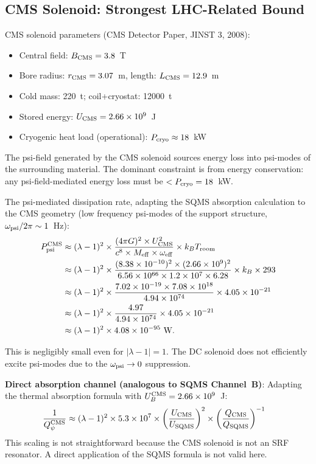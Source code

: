 \documentclass[11pt,twocolumn]{article}
\newcommand{\lam}{\lambda}
\begin{document}
\subsection{CMS Solenoid: Strongest LHC-Related Bound}

CMS solenoid parameters (CMS Detector Paper, JINST 3, 2008):
\begin{itemize}[nosep]
\item Central field: $B_{\rm CMS} = 3.8$~T
\item Bore radius: $r_{\rm CMS} = 3.07$~m, length: $L_{\rm CMS} = 12.9$~m
\item Cold mass: 220~t; coil+cryostat: 12000~t
\item Stored energy: $U_{\rm CMS} = 2.66\times10^9$~J
\item Cryogenic heat load (operational): $P_{\rm cryo} \approx 18$~kW
\end{itemize}

The psi-field generated by the CMS solenoid sources energy loss into psi-modes
of the surrounding material. The dominant constraint is from energy conservation:
any psi-field-mediated energy loss must be $< P_{\rm cryo} = 18$~kW.

The psi-mediated dissipation rate, adapting the SQMS absorption calculation
to the CMS geometry (low frequency psi-modes of the support structure,
$\omega_{\rm psi}/2\pi \sim 1$~Hz):
\begin{align}
P_{\rm psi}^{\rm CMS} &\approx (\lam-1)^2\times
\frac{(4\pi G)^2\times U_{\rm CMS}^2}
{c^8\times M_{\rm eff}\times\omega_{\rm eff}}
\times k_B T_{\rm room}
\nonumber\\
&\approx (\lam-1)^2\times
\frac{(8.38\times10^{-10})^2\times(2.66\times10^9)^2}
{6.56\times10^{66}\times1.2\times10^7\times6.28}
\times k_B\times293
\nonumber\\
&\approx (\lam-1)^2\times
\frac{7.02\times10^{-19}\times7.08\times10^{18}}
{4.94\times10^{74}}
\times4.05\times10^{-21}
\nonumber\\
&\approx (\lam-1)^2\times\frac{4.97}{4.94\times10^{74}}
\times4.05\times10^{-21}
\nonumber\\
&\approx (\lam-1)^2\times4.08\times10^{-95}~\text{W}.
\end{align}

This is negligibly small even for $|\lam-1| = 1$. The DC solenoid does not
efficiently excite psi-modes due to the $\omega_{\rm psi} \to 0$ suppression.

\textbf{Direct absorption channel (analogous to SQMS Channel~B)}:
Adapting the thermal absorption formula with $U_B^{\rm CMS} = 2.66\times10^9$~J:
\begin{align}
\frac{1}{Q_\psi^{\rm CMS}} &\approx (\lam-1)^2\times
5.3\times10^7\times\left(\frac{U_{\rm CMS}}{U_{\rm SQMS}}\right)^2
\times\left(\frac{Q_{\rm CMS}}{Q_{\rm SQMS}}\right)^{-1}
\end{align}
This scaling is not straightforward because the CMS solenoid is not an SRF
resonator. A direct application of the SQMS formula is not valid here.
\end{document}
